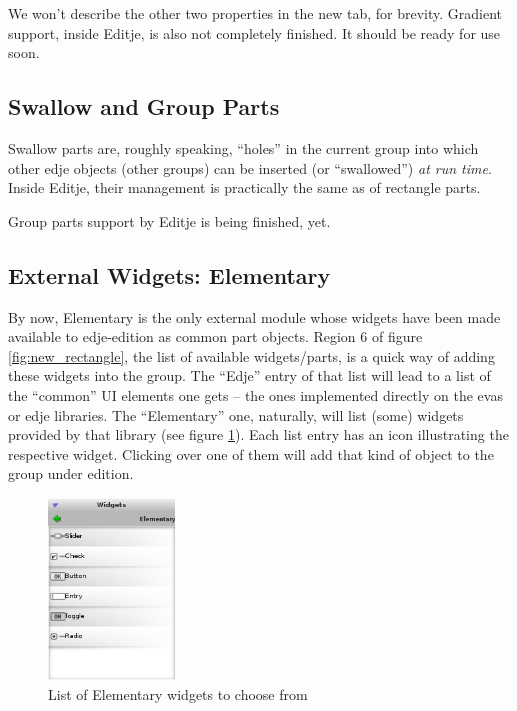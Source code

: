 \documentclass[a4paper]{profusion}
\begin{document}

We won't describe the other two properties in the new tab, for
brevity. Gradient support, inside Editje, is also not completely
finished. It should be ready for use soon.

\subsection{Swallow and Group Parts}

Swallow parts are, roughly speaking, ``holes'' in the current group
into which other edje objects (other groups) can be inserted (or
``swallowed'') \emph{at run time}. Inside Editje, their management is
practically the same as of rectangle parts.

Group parts support by Editje is being finished, yet.

\subsection{External Widgets: Elementary}

By now, Elementary is the only external module whose widgets have been
made available to edje-edition as common part objects. Region 6 of
figure \ref{fig:new_rectangle}, the list of available widgets/parts,
is a quick way of adding these widgets into the group. The ``Edje''
entry of that list will lead to a list of the ``common'' UI elements
one gets -- the ones implemented directly on the evas or edje
libraries. The ``Elementary'' one, naturally, will list (some) widgets
provided by that library (see figure \ref{fig:elm_widgets}). Each list
entry has an icon illustrating the respective widget. Clicking over
one of them will add that kind of object to the group under edition.

\begin{figure}[h!]
  \centering
  \includegraphics[width=0.3\textwidth]{images/elm_widgets.png}
  \caption{List of Elementary widgets to choose from}
  \label{fig:elm_widgets}
\end{figure}
\end{document}
